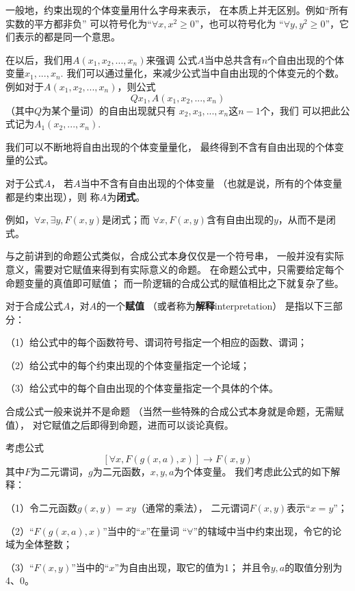 一般地，约束出现的个体变量用什么字母来表示，
在本质上并无区别。例如“所有实数的平方都非负”
可以符号化为“$\forall x,x^2\geq0$”，也可以符号化为
“$\forall y,y^2\geq0$”，它们表示的都是同一个意思。\vsp

在以后，我们用$A(x_1,x_2,...,x_n)$来强调
公式$A$当中总共含有$n$个自由出现的个体变量$x_1,...,x_n$.
我们可以通过量化，来减少公式当中自由出现的个体变元的个数。
例如对于$A(x_1,x_2,...,x_n)$，则公式
$$Qx_1,A(x_1,x_2,...,x_n)$$
（其中$Q$为某个量词）的自由出现就只有
$x_2,x_3,...,x_n$这$n-1$个，我们
可以把此公式记为$A_1(x_2,...,x_n)$.

我们可以不断地将自由出现的个体变量量化，
最终得到不含有自由出现的个体变量的公式。

\begin{definition}[闭式]对于公式$A$，
若$A$当中不含有自由出现的个体变量
（也就是说，所有的个体变量都是约束出现），则
称$A$为\textbf{闭式}。
\end{definition}

例如，$\forall x,\exists y,F(x,y)$是闭式；而
$\forall x,F(x,y)$含有自由出现的$y$，从而不是闭式。\vs

与之前讲到的命题公式类似，合成公式本身仅仅是一个符号串，
一般并没有实际意义，需要对它赋值来得到有实际意义的命题。
在命题公式中，只需要给定每个命题变量的真值即可赋值；
而一阶逻辑的合成公式的赋值相比之下就复杂了些。

\begin{definition}[合成公式的赋值]
对于合成公式$A$，对$A$的一个\textbf{赋值}
（或者称为\textbf{解释}interpretation）
是指以下三部分：

（1）给公式中的每个函数符号、谓词符号指定一个相应的函数、谓词；

（2）给公式中的每个约束出现的个体变量指定一个论域；

（3）给公式中的每个自由出现的个体变量指定一个具体的个体。
\end{definition}

合成公式一般来说并不是命题
（当然一些特殊的合成公式本身就是命题，无需赋值），
对它赋值之后即得到命题，进而可以谈论真假。

\begin{example}考虑公式
$$[\forall x,F(g(x,a),x)]\rightarrow F(x,y)$$
其中$F$为二元谓词，$g$为二元函数，$x,y,a$为个体变量。
我们考虑此公式的如下解释：

（1）令二元函数$g(x,y)=xy$（通常的乘法），
二元谓词$F(x,y)$表示“$x=y$”；

（2）“$F(g(x,a),x)$”当中的“$x$”在量词
“$\forall$”的辖域中当中约束出现，令它的论域为全体整数；

（3）“$F(x,y)$”当中的“$x$”为自由出现，取它的值为1；
并且令$y,a$的取值分别为4、0。
\end{example}

